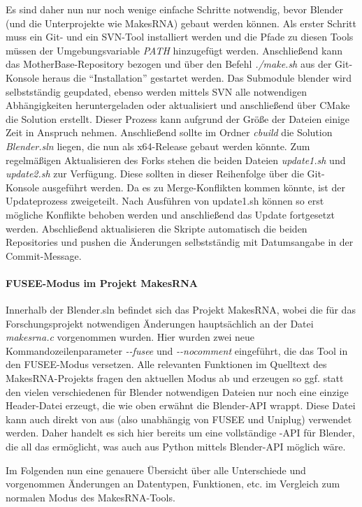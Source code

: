 Es sind daher nun nur noch wenige einfache Schritte notwendig, bevor Blender (und die Unterprojekte wie MakesRNA) gebaut werden können. Als erster Schritt muss ein Git- und ein SVN-Tool installiert werden und die Pfade zu diesen Tools müssen der Umgebungsvariable \emph{PATH} hinzugefügt werden. Anschließend kann das MotherBase-Repository bezogen und über den Befehl \emph{./make.sh} aus der Git-Konsole heraus die \enquote{Installation} gestartet werden. Das Submodule blender wird selbstständig geupdated, ebenso werden mittels SVN alle notwendigen Abhängigkeiten heruntergeladen oder aktualisiert und anschließend über CMake die Solution erstellt. Dieser Prozess kann aufgrund der Größe der Dateien einige Zeit in Anspruch nehmen. Anschließend sollte im Ordner \emph{cbuild} die Solution \emph{Blender.sln} liegen, die nun als x64-Release gebaut werden könnte. Zum regelmäßigen Aktualisieren des Forks stehen die beiden Dateien \emph{update1.sh} und \emph{update2.sh} zur Verfügung. Diese sollten in dieser Reihenfolge über die Git-Konsole ausgeführt werden. Da es zu Merge-Konflikten kommen könnte, ist der Updateprozess zweigeteilt. Nach Ausführen von update1.sh können so erst mögliche Konflikte behoben werden und anschließend das Update fortgesetzt werden. Abschließend aktualisieren die Skripte automatisch die beiden Repositories und pushen die Änderungen selbstständig mit Datumsangabe in der Commit-Message.

\paragraph{FUSEE-Modus im Projekt MakesRNA}

Innerhalb der Blender.sln befindet sich das Projekt MakesRNA, wobei die für das Forschungsprojekt notwendigen Änderungen hauptsächlich an der Datei \emph{makesrna.c} vorgenommen wurden. Hier wurden zwei neue Kommandozeilenparameter \emph{-{}-fusee} und \emph{-{}-nocomment} eingeführt, die das Tool in den FUSEE-Modus versetzen. Alle relevanten Funktionen im Quelltext des MakesRNA-Projekts fragen den aktuellen Modus ab und erzeugen so ggf. statt den vielen verschiedenen für Blender notwendigen Dateien nur noch eine einzige Header-Datei erzeugt, die wie oben erwähnt die Blender-API wrappt. Diese Datei kann auch direkt von \CC{} aus (also unabhängig von FUSEE und Uniplug) verwendet werden. Daher handelt es sich hier bereits um eine vollständige \CC-API für Blender, die all das ermöglicht, was auch aus Python mittels Blender-API möglich wäre.

Im Folgenden nun eine genauere Übersicht über alle Unterschiede und vorgenommen Änderungen an Datentypen, Funktionen, etc. im Vergleich zum normalen Modus des MakesRNA-Tools.

